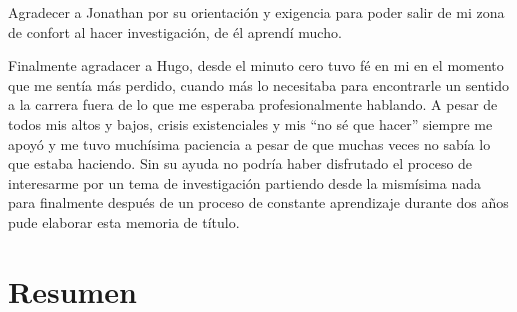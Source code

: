 \documentclass[11pt]{report}
\begin{document}
Agradecer a Jonathan por su orientación y exigencia para poder salir de mi zona de confort al hacer investigación, de él aprendí mucho.

Finalmente agradacer a Hugo, desde el minuto cero tuvo fé en mi en el momento que me sentía más perdido, cuando más lo necesitaba para encontrarle un sentido a la carrera fuera de lo que me esperaba profesionalmente hablando. A pesar de todos mis altos y bajos, crisis existenciales y mis ``no sé que hacer'' siempre me apoyó y me tuvo muchísima paciencia a pesar de que muchas veces no sabía lo que estaba haciendo. Sin su ayuda no podría haber disfrutado el proceso de interesarme por un tema de investigación partiendo desde la mismísima nada para finalmente después de un proceso de constante aprendizaje durante dos años pude elaborar esta memoria de título.






    
	\chapter*{Resumen}
    
	\tableofcontents
	\listoftables	
	\listoffigures

	\newpage
	\pagestyle{fancy} %
	
    
    
    
	
    
	
	
	
	
	\appendix
	\renewcommand{\chaptertitlename}{Anexo}
    
\end{document}
